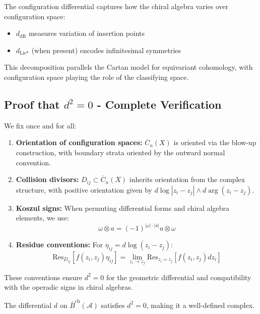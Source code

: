    \begin{remark}
   The configuration differential captures how the chiral algebra varies over configuration space:
   \begin{itemize}
   \item $d_{\text{dR}}$ measures variation of insertion points
   \item $d_{\text{Lie*}}$ (when present) encodes infinitesimal symmetries
   \end{itemize}
   
   This decomposition parallels the Cartan model for equivariant cohomology, with configuration space 
   playing the role of the classifying space.
   \end{remark}

\subsection{Proof that $d^2 = 0$ - Complete Verification}
 
\begin{convention}\label{conv:orientations}
We fix once and for all:
\begin{enumerate}
\item \textbf{Orientation of configuration spaces:} $\overline{C}_n(X)$ is oriented via the blow-up construction, with boundary strata oriented by the outward normal convention.

\item \textbf{Collision divisors:} $D_{ij} \subset \overline{C}_n(X)$ inherits orientation from the complex structure, with positive orientation given by $d\log|z_i - z_j| \wedge d\arg(z_i - z_j)$.

\item \textbf{Koszul signs:} When permuting differential forms and chiral algebra elements, we use:
\[
\omega \otimes a = (-1)^{|\omega| \cdot |a|} a \otimes \omega
\]

\item \textbf{Residue conventions:} For $\eta_{ij} = d\log(z_i - z_j)$:
\[
\text{Res}_{D_{ij}}[f(z_i, z_j) \eta_{ij}] = \lim_{z_i \to z_j} \text{Res}_{z_i = z_j}[f(z_i, z_j) dz_i]
\]
\end{enumerate}
These conventions ensure $d^2 = 0$ for the geometric differential and compatibility with the operadic signs in chiral algebras.
\end{convention}

\begin{theorem}\label{thm:d-squared}
The differential $d$ on $\bar{B}^{\text{ch}}(\mathcal{A})$ satisfies $d^2 = 0$, making it a well-defined complex.
\end{theorem}

